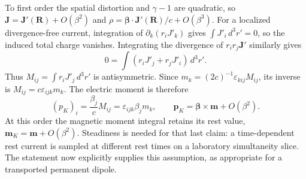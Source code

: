 To first order the spatial distortion and $\gamma-1$ are quadratic,
so $\mathbf J=\mathbf J'(\mathbf R)+O(\beta^2)$ and
$\rho=\boldsymbol\beta\cdot\mathbf J'(\mathbf R)/c+O(\beta^3)$.
For a localized divergence-free current, integration of
$\partial_k(r_iJ'_k)$ gives $\int J'_i\,d^3r'=0$, so the
induced total charge vanishes. Integrating the divergence of
$r_ir_j\mathbf J'$ similarly gives
\[
0=\int(r_iJ'_j+r_jJ'_i)\,d^3r'.
\]
Thus $M_{ij}=\int r_iJ'_j\,d^3r'$ is antisymmetric. Since
$m_k=(2c)^{-1}\varepsilon_{kij}M_{ij}$, its inverse is
$M_{ij}=c\varepsilon_{ijk}m_k$. The electric moment is therefore
\[
(p_K)_i=\frac{\beta_j}{c}M_{ij}
=\varepsilon_{ijk}\beta_jm_k,
\qquad\boxed{\mathbf p_K=\boldsymbol\beta\times\mathbf m+O(\beta^2).}
\]
At this order the magnetic moment integral retains its rest value,
$\mathbf m_K=\mathbf m+O(\beta^2)$.
Steadiness is needed for that last claim: a time-dependent rest
current is sampled at different rest times on a laboratory
simultaneity slice. The statement now explicitly supplies this
assumption, as appropriate for a transported permanent dipole.

